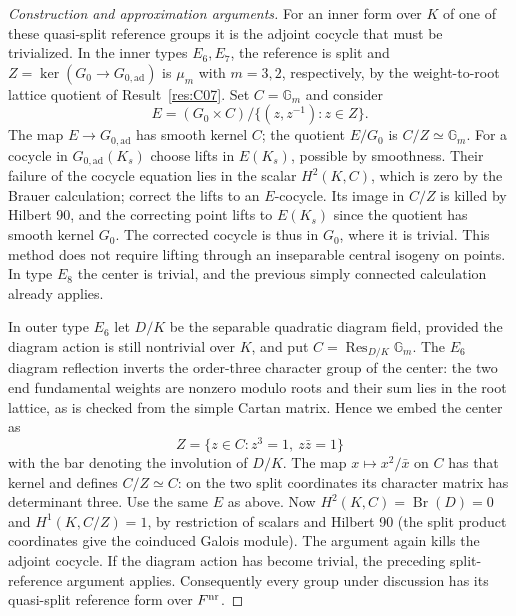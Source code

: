 \documentclass[11pt,a4paper,openany,oneside]{book}
\theoremstyle{resultstyle}
\theoremstyle{definition}
\numberwithin{equation}{chapter}
\begin{document}
\begin{proof}[Construction and approximation arguments]
For an inner form over \(K\) of one of these
quasi-split reference groups it is the adjoint
cocycle that must be trivialized. In the inner
types \(E_6,E_7\), the reference is split and
\(Z=\ker(G_0\to G_{0,\mathrm{ad}})\) is \(\mu_m\)
with \(m=3,2\), respectively, by the weight-to-root
lattice quotient of Result~\ref{res:C07}. Set
\(C=\mathbb G_m\) and consider
\[
 E=(G_0\times C)/\{(z,z^{-1}):z\in Z\}.
\]
The map \(E\to G_{0,\mathrm{ad}}\) has smooth kernel \(C\);
the quotient \(E/G_0\) is \(C/Z\simeq\mathbb G_m\).
For a cocycle in \(G_{0,\mathrm{ad}}(K_s)\) choose lifts
in \(E(K_s)\), possible by smoothness. Their failure
of the cocycle equation lies in the scalar \(H^2(K,C)\),
which is zero by the Brauer calculation; correct
the lifts to an \(E\)-cocycle. Its image in \(C/Z\) is
killed by Hilbert 90, and the correcting point lifts
to \(E(K_s)\) since the quotient has smooth kernel \(G_0\).
The corrected cocycle is thus in \(G_0\), where it is
trivial. This method does not require lifting
through an inseparable central isogeny on points.
In type \(E_8\) the center is trivial, and the previous
simply connected calculation already applies.

In outer type \(E_6\) let \(D/K\) be the separable
quadratic diagram field, provided the diagram action is
still nontrivial over \(K\), and put \(C=\operatorname{Res}_{D/K}
\mathbb G_m\). The \(E_6\) diagram reflection inverts
the order-three character group of the center: the
two end fundamental weights are nonzero modulo roots
and their sum lies in the root lattice, as is checked
from the simple Cartan matrix. Hence we embed the center as
\[
 Z=\{z\in C:z^3=1,\ z\bar z=1\}
\]
with the bar denoting the involution of \(D/K\).
The map \(x\mapsto x^2/\bar x\) on \(C\) has that kernel
and defines \(C/Z\simeq C\): on the two split coordinates
its character matrix has determinant three. Use the
same \(E\) as above. Now \(H^2(K,C)=\operatorname{Br}(D)=0\)
and \(H^1(K,C/Z)=1\), by restriction of scalars and Hilbert 90
(the split product coordinates give the coinduced Galois
module). The argument again kills the adjoint cocycle.
If the diagram action has become trivial, the preceding
split-reference argument applies. Consequently every
group under discussion has its quasi-split reference form
over \(F^{\rm nr}\).


\end{proof}
\end{document}
